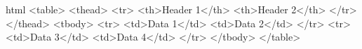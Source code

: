 html
<table>
  <thead>
    <tr>
      <th>Header 1</th>
      <th>Header 2</th>
    </tr>
  </thead>
  <tbody>
    <tr>
      <td>Data 1</td>
      <td>Data 2</td>
    </tr>
    <tr>
      <td>Data 3</td>
      <td>Data 4</td>
    </tr>
  </tbody>
</table>